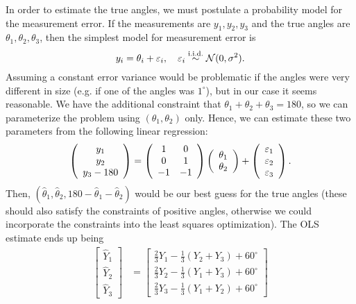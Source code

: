 In order to estimate the true angles, we must postulate a probability model for the measurement error. If the measurements are $y_1, y_2, y_3$ and the true angles are $\theta_1, \theta_2, \theta_3$, then the simplest model for measurement error is
\begin{equation}
y_i = \theta_i + {\varepsilon}_i, \quad {\varepsilon}_{i} \overset{\text{i.i.d.}}\sim \mathcal N(0, \sigma^2).
\end{equation}
Assuming a constant error variance would be problematic if the angles were very different in size (e.g. if one of the angles was $1^\circ$), but in our case it seems reasonable. We have the additional constraint that $\theta_1 + \theta_2 + \theta_3 = 180$, so we can parameterize the problem using $(\theta_1, \theta_2)$ only. Hence, we can estimate these two parameters from the following linear regression:
\begin{equation}
\left( \begin{array}{c}
y_1 \\
y_2 \\
y_3 - 180 \end{array} \right)= \left( \begin{array}{cc}
1 & 0 \\
0 & 1\\
-1 & -1 \end{array} \right)\left( \begin{array}{c}
\theta_1 \\
\theta_2 \end{array} \right) + \left( \begin{array}{c}
{\varepsilon}_1 \\
{\varepsilon}_2 \\
{\varepsilon}_3 \end{array} \right). 
\end{equation}
Then, $(\hat \theta_1, \hat \theta_2, 180 - \hat \theta_1 - \hat \theta_2)$ would be our best guess for the true angles (these should also satisfy the constraints of positive angles, otherwise we could incorporate the constraints into the least squares optimization). The OLS estimate ends up being 
\begin{align*}
	\begin{bmatrix}
		\hat{Y}_1 \\ \hat{Y}_2 \\ \hat{Y}_3
	\end{bmatrix} &= \begin{bmatrix}
		\frac{2}{3}Y_1 - \frac{1}{3}(Y_2+Y_3) + 60^\circ\\
		\frac{2}{3}Y_2 - \frac{1}{3}(Y_1+Y_3) + 60^\circ\\
		\frac{2}{3}Y_3 - \frac{1}{3}(Y_1+Y_2) + 60^\circ
	\end{bmatrix}
\end{align*}


